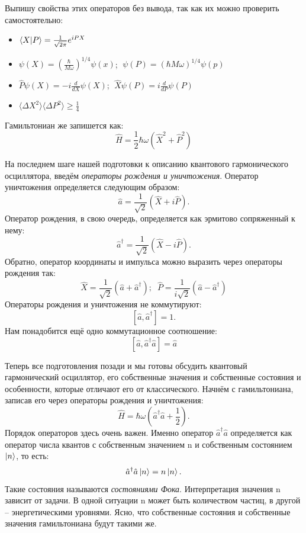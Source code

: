 Выпишу свойства этих операторов без вывода, так как их можно проверить самостоятельно:
\begin{itemize}
    \item $\bra{X}\ket{P} = \frac{1}{\sqrt{2\pi}}e^{iPX}$
    \item $\psi(X) = \left(\frac{\hbar}{M\omega}\right)^{1/4}\psi(x)$; $\;\psi(P) = \left(\hbar M\omega \right)^{1/4}\psi(p)$
    \item $\hat{P}\psi(X) = -i\frac{d}{dX}\psi(X)$;   $\;\hat{X}\psi(P) = i\frac{d}{dP}\psi(P)$
    \item $\langle\Delta X^2\rangle\langle\Delta P^2\rangle \geq \frac{1}{4}$
\end{itemize}
Гамильтониан же запишется как:
\[
\hat{H} = \frac{1}{2}\hbar\omega(\hat{X}^2 + \hat{P}^2)
\]

На последнем шаге нашей подготовки к описанию квантового гармонического осциллятора, введём \textit{операторы рождения и уничтожения}. Оператор уничтожения определяется следующим образом:
\[
\hat{a} = \frac{1}{\sqrt{2}}\left(\hat{X} + i\hat{P} \right).
\]
Оператор рождения, в свою очередь, определяется как эрмитово сопряженный к нему:
\[
\hat{a}^{\dagger} = \frac{1}{\sqrt{2}}\left(\hat{X} - i\hat{P} \right).
\]
Обратно, оператор координаты и импульса можно выразить через операторы рождения так:
\[
\hat{X} = \frac{1}{\sqrt{2}}(\hat{a} + \hat{a}^{\dagger}); \;\; \hat{P} = \frac{1}{i\sqrt{2}}(\hat{a} - \hat{a}^{\dagger})
\]
Операторы рождения и уничтожения не коммутируют:
\[
[\hat{a}, \hat{a}^{\dagger}] = 1.
\]
Нам понадобится ещё одно коммутационное соотношение:
\[
[\hat{a}, \hat{a}^{\dagger}\hat{a}] = \hat{a}
\]

Теперь все подготовления позади и мы готовы обсудить квантовый гармонический осциллятор, его собственные значения и собственные состояния и особенности, которые отличают его от классического. Начнём с гамильтониана, записав его через операторы рождения и уничтожения:
\[
\hat{H} = \hbar\omega\left( \hat{a}^{\dagger}\hat{a} + \frac{1}{2}\right).
\]
Порядок операторов здесь очень важен. Именно оператор $\hat{a}^{\dagger}\hat{a}$ определяется как оператор числа квантов с собственным значением n и собственным состоянием $\ket{n}$, то есть:
\[
\hat{a}^{\dagger}\hat{a}\ket{n} = n\ket{n}.
\] 
Такие состояния называются \textit{состояниями Фока}. Интерпретация значения n зависит от задачи. В одной ситуации n может быть количеством частиц, в другой -- энергетическими уровнями. Ясно, что собственные состояния и собственные значения гамильтониана будут такими же.


